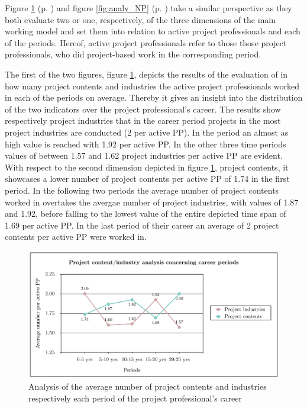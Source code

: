 Figure \ref{fig:analy_PCI} (p. \pageref{fig:analy_PCI}) and figure \ref{fig:analy_NP} (p. \pageref{fig:analy_NP}) take a similar perspective as they both evaluate two or one, respectively, of the three dimensions of the main working model and set them into relation to active project professionals and each of the periods. Hereof, active project professionals refer to those those project professionals, who did project-based work in the corresponding period.

The first of the two figures, figure \ref{fig:analy_PCI}, depicts the results of the evaluation of in how many project contents and industries the active project professionals worked in each of the periods on average. Thereby it gives an insight into the distribution of the two indicators over the project professional's career. The results show respectively  project industries that in the  career period projects in the most project industries are conducted (2 per active PP). In the  period an almost as high value is reached with 1.92 per active PP. In the other three time periods values of between 1.57 and 1.62 project industries per active PP are evident. With respect to the second dimension depicted in figure \ref{fig:analy_PCI}, project contents, it showcases a lower number of project contents per active PP of 1.74 in the first period. In the following two periods the average number of project contents worked in overtakes the avergae number of project industries, with values of 1.87 and 1.92, before falling to the lowest value of the entire depicted time span  of 1.69 per active PP. In the last period of their career an average of 2 project contents per active PP were worked in.  \\

\begin{figure}[!hbt]
    \captionsetup{font=small}
  \centering
  \includegraphics[width=.6\columnwidth]{figures/Analysis_PCI.png}
  \caption[Analysis of project contents and industries respectively the PP's career]{Analysis of the average number of project contents and industries respectively each period of the project professional's career}
  \label{fig:analy_PCI}
\end{figure}

